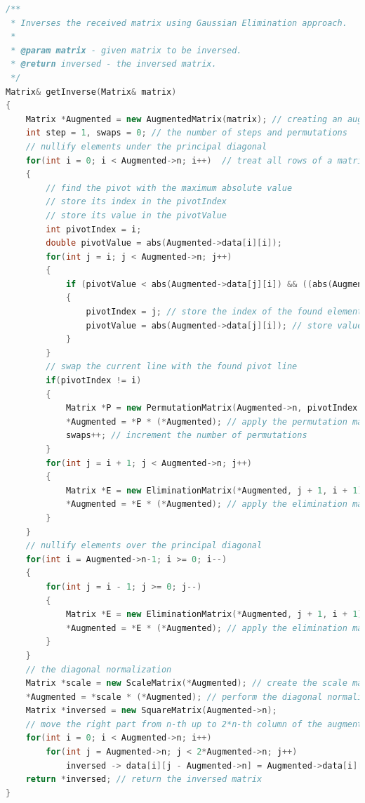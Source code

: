 \documentclass[11pt]{article}
\begin{document}
\begin{lstlisting}[language=C++, caption=Implementation of Least-squares approximation algorithm]
/**
 * Inverses the received matrix using Gaussian Elimination approach.
 *
 * @param matrix - given matrix to be inversed.
 * @return inversed - the inversed matrix.
 */
Matrix& getInverse(Matrix& matrix)
{
    Matrix *Augmented = new AugmentedMatrix(matrix); // creating an augmented matrix
    int step = 1, swaps = 0; // the number of steps and permutations
    // nullify elements under the principal diagonal
    for(int i = 0; i < Augmented->n; i++)  // treat all rows of a matrix
    {
        // find the pivot with the maximum absolute value
        // store its index in the pivotIndex
        // store its value in the pivotValue
        int pivotIndex = i;
        double pivotValue = abs(Augmented->data[i][i]);
        for(int j = i; j < Augmented->n; j++)
        {
            if (pivotValue < abs(Augmented->data[j][i]) && ((abs(Augmented->data[j][i]) - pivotValue) >= 0.01)) // find the pivot with maximum absolute value
            {
                pivotIndex = j; // store the index of the found element
                pivotValue = abs(Augmented->data[j][i]); // store value of the found element
            }
        }
        // swap the current line with the found pivot line
        if(pivotIndex != i)
        {
            Matrix *P = new PermutationMatrix(Augmented->n, pivotIndex + 1, i + 1); // create the permutation matrix P_{pivotline+1 i+1} for a current state
            *Augmented = *P * (*Augmented); // apply the permutation matrix
            swaps++; // increment the number of permutations
        }
        for(int j = i + 1; j < Augmented->n; j++)
        {
            Matrix *E = new EliminationMatrix(*Augmented, j + 1, i + 1); // create the elimination matrix E_{j+1 i+1} for a current state
            *Augmented = *E * (*Augmented); // apply the elimination matrix
        }
    }
    // nullify elements over the principal diagonal
    for(int i = Augmented->n-1; i >= 0; i--)
    {
        for(int j = i - 1; j >= 0; j--)
        {
            Matrix *E = new EliminationMatrix(*Augmented, j + 1, i + 1); // create the elimination matrix E_{j+1 i+1} for a current state
            *Augmented = *E * (*Augmented); // apply the elimination matrix
        }
    }
    // the diagonal normalization
    Matrix *scale = new ScaleMatrix(*Augmented); // create the scale matrix for the diagonal normalization
    *Augmented = *scale * (*Augmented); // perform the diagonal normalization
    Matrix *inversed = new SquareMatrix(Augmented->n);
    // move the right part from n-th up to 2*n-th column of the augmented matrix to a created "inversed" matrix
    for(int i = 0; i < Augmented->n; i++)
        for(int j = Augmented->n; j < 2*Augmented->n; j++)
            inversed -> data[i][j - Augmented->n] = Augmented->data[i][j];
    return *inversed; // return the inversed matrix
}


\end{lstlisting}
\end{document}
